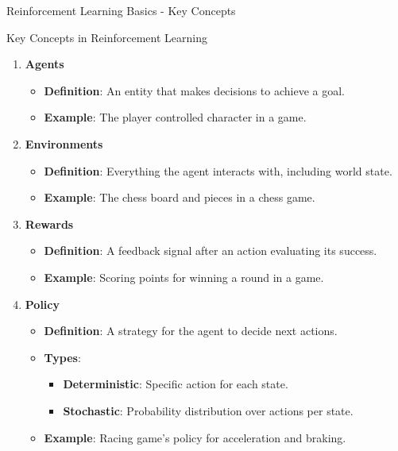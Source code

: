 \documentclass[aspectratio=169]{beamer}
\begin{document}
\begin{frame}[fragile]{Reinforcement Learning Basics - Key Concepts}
    \begin{block}{Key Concepts in Reinforcement Learning}
        \begin{enumerate}
            \item \textbf{Agents}
            \begin{itemize}
                \item \textbf{Definition}: An entity that makes decisions to achieve a goal.
                \item \textbf{Example}: The player controlled character in a game.
            \end{itemize}

            \item \textbf{Environments} 
            \begin{itemize}
                \item \textbf{Definition}: Everything the agent interacts with, including world state.
                \item \textbf{Example}: The chess board and pieces in a chess game.
            \end{itemize}

            \item \textbf{Rewards} 
            \begin{itemize}
                \item \textbf{Definition}: A feedback signal after an action evaluating its success.
                \item \textbf{Example}: Scoring points for winning a round in a game.
            \end{itemize}

            \item \textbf{Policy}
            \begin{itemize}
                \item \textbf{Definition}: A strategy for the agent to decide next actions.
                \item \textbf{Types}:
                \begin{itemize}
                    \item \textbf{Deterministic}: Specific action for each state.
                    \item \textbf{Stochastic}: Probability distribution over actions per state.
                \end{itemize}
                \item \textbf{Example}: Racing game's policy for acceleration and braking.
            \end{itemize}
        \end{enumerate}
    \end{block}
\end{frame}
\end{document}
